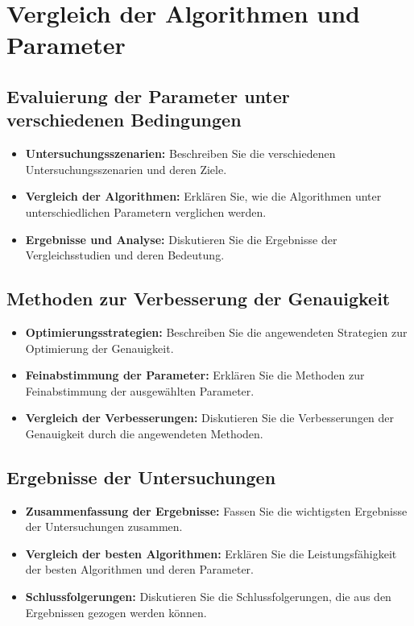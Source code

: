 \chapter{Vergleich der Algorithmen und Parameter}

\section{Evaluierung der Parameter unter verschiedenen Bedingungen}
\begin{itemize}
    \item \textbf{Untersuchungsszenarien:} Beschreiben Sie die verschiedenen Untersuchungsszenarien und deren Ziele.
    \item \textbf{Vergleich der Algorithmen:} Erklären Sie, wie die Algorithmen unter unterschiedlichen Parametern verglichen werden.
    \item \textbf{Ergebnisse und Analyse:} Diskutieren Sie die Ergebnisse der Vergleichsstudien und deren Bedeutung.
\end{itemize}

\section{Methoden zur Verbesserung der Genauigkeit}
\begin{itemize}
    \item \textbf{Optimierungsstrategien:} Beschreiben Sie die angewendeten Strategien zur Optimierung der Genauigkeit.
    \item \textbf{Feinabstimmung der Parameter:} Erklären Sie die Methoden zur Feinabstimmung der ausgewählten Parameter.
    \item \textbf{Vergleich der Verbesserungen:} Diskutieren Sie die Verbesserungen der Genauigkeit durch die angewendeten Methoden.
\end{itemize}

\section{Ergebnisse der Untersuchungen}
\begin{itemize}
    \item \textbf{Zusammenfassung der Ergebnisse:} Fassen Sie die wichtigsten Ergebnisse der Untersuchungen zusammen.
    \item \textbf{Vergleich der besten Algorithmen:} Erklären Sie die Leistungsfähigkeit der besten Algorithmen und deren Parameter.
    \item \textbf{Schlussfolgerungen:} Diskutieren Sie die Schlussfolgerungen, die aus den Ergebnissen gezogen werden können.
\end{itemize}
